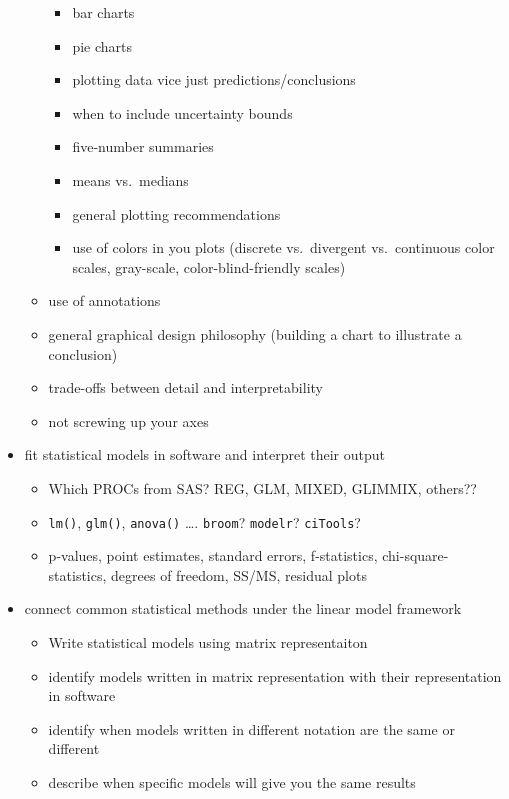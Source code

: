 \documentclass[
]{book}
\providecommand{\tightlist}{%
  \setlength{\itemsep}{0pt}\setlength{\parskip}{0pt}}
\theoremstyle{definition}
\theoremstyle{definition}
\theoremstyle{definition}
\theoremstyle{remark}
\begin{document}
\begin{itemize}
\begin{itemize}
    \begin{itemize}
    \tightlist
    \item
      bar charts
    \item
      pie charts
    \item
      plotting data vice just predictions/conclusions
    \item
      when to include uncertainty bounds
    \item
      five-number summaries
    \item
      means vs.~medians
    \item
      general plotting recommendations
    \item
      use of colors in you plots (discrete vs.~divergent vs.~continuous color scales, gray-scale, color-blind-friendly scales)
    \end{itemize}
  \item
    use of annotations
  \item
    general graphical design philosophy (building a chart to illustrate a conclusion)
  \item
    trade-offs between detail and interpretability
  \item
    not screwing up your axes
  \end{itemize}
\item
  fit statistical models in software and interpret their output

  \begin{itemize}
  \tightlist
  \item
    Which PROCs from SAS? REG, GLM, MIXED, GLIMMIX, others??
  \item
    \texttt{lm()}, \texttt{glm()}, \texttt{anova()} \ldots{}. \texttt{broom}? \texttt{modelr}? \texttt{ciTools}?
  \item
    p-values, point estimates, standard errors, f-statistics, chi-square-statistics, degrees of freedom, SS/MS, residual plots
  \end{itemize}
\item
  connect common statistical methods under the linear model framework

  \begin{itemize}
  \tightlist
  \item
    Write statistical models using matrix representaiton
  \item
    identify models written in matrix representation with their representation in software
  \item
    identify when models written in different notation are the same or different
  \item
    describe when specific models will give you the same results


\end{itemize}
\end{itemize}
\end{document}
